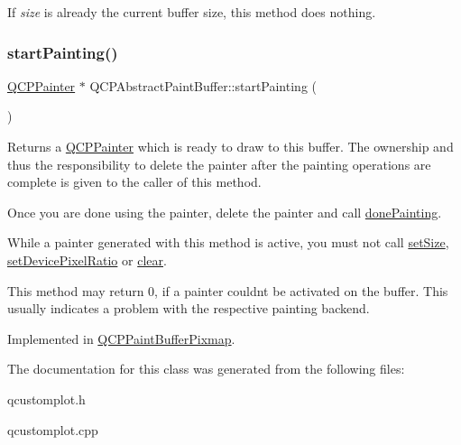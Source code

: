 If {\itshape size} is already the current buffer size, this method does nothing. \mbox{\label{class_q_c_p_abstract_paint_buffer_a9e9f29b19c033cf02fb96f1a148463f3}} 
\subsubsection{\texorpdfstring{start\+Painting()}{startPainting()}}
{\footnotesize\ttfamily \hyperlink{class_q_c_p_painter}{Q\+C\+P\+Painter} $\ast$ Q\+C\+P\+Abstract\+Paint\+Buffer\+::start\+Painting (\begin{DoxyParamCaption}{ }\end{DoxyParamCaption})\hspace{0.3cm}{\ttfamily [pure virtual]}}

Returns a \hyperlink{class_q_c_p_painter}{Q\+C\+P\+Painter} which is ready to draw to this buffer. The ownership and thus the responsibility to delete the painter after the painting operations are complete is given to the caller of this method.

Once you are done using the painter, delete the painter and call \hyperlink{class_q_c_p_abstract_paint_buffer_a41b0dc6e7744f19fae09f8532c207dc1}{done\+Painting}.

While a painter generated with this method is active, you must not call \hyperlink{class_q_c_p_abstract_paint_buffer_a8b68c3cd36533f1a4a23b5ce8cd66f01}{set\+Size}, \hyperlink{class_q_c_p_abstract_paint_buffer_a555eaad5d5c806420ff35602a1bb68fa}{set\+Device\+Pixel\+Ratio} or \hyperlink{class_q_c_p_abstract_paint_buffer_a9e253f4541dfc01992b77e8830bd7722}{clear}.

This method may return 0, if a painter couldn\textquotesingle{}t be activated on the buffer. This usually indicates a problem with the respective painting backend. 

Implemented in \hyperlink{class_q_c_p_paint_buffer_pixmap_a357964ef7d28cfa530338be4e5c93234}{Q\+C\+P\+Paint\+Buffer\+Pixmap}.



The documentation for this class was generated from the following files\+:\begin{DoxyCompactItemize}
\item 
qcustomplot.\+h\item 
qcustomplot.\+cpp\end{DoxyCompactItemize}
